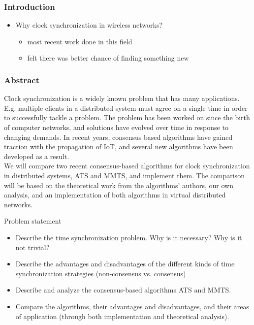 \documentclass{beamer}
\begin{document}
\begin{frame}
  \frametitle{Introduction}
  \begin{itemize}
  \item<1-> Why clock synchronization in wireless networks?
    \begin{itemize}
    \item<2-> most recent work done in this field
    \item<3-> felt there was better chance of finding something new
    \end{itemize}
  \end{itemize}
\end{frame}
 
\begin{frame}
\frametitle{Abstract}
Clock synchronization is a widely known problem that has many applications. E.g. multiple clients in a distributed system must agree on a single time in order to successfully tackle a problem. The problem has been worked on since the birth of computer networks, and solutions have evolved over time in response to changing demands. In recent years, consensus based algorithms have gained traction with the propagation of IoT, and several new algorithms have been developed as a result.\\
\vspace{1em}
We will compare two recent consensus-based algorithms for clock synchronization in distributed systems, ATS and MMTS, and implement them. The comparison will be based on the theoretical work from the algorithms' authors, our own analysis, and an implementation of both algorithms in virtual distributed networks.
\end{frame}

\begin{frame}{Problem statement}
\begin{itemize}
    \item Describe the time synchronization problem. Why is it necessary? Why is it not trivial? 
    \item Describe the advantages and disadvantages of the different kinds of time synchronization strategies (non-consensus vs. consensus)
    \item Describe and analyze the consensus-based algorithms ATS and MMTS.
    \item Compare the algorithms, their advantages and disadvantages, and their areas of application (through both implementation and theoretical analysis).
\end{itemize}

\end{frame}
 
\end{document}
